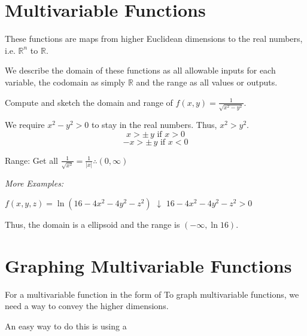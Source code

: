 \documentclass[../main.tex]{subfiles}
\begin{document}

\section{Multivariable Functions}

These functions are maps from higher Euclidean dimensions to the real numbers, i.e. \( \mathbb{R}^n \) to \( \mathbb{R} \).

We describe the domain of these functions as all allowable inputs for each variable, the codomain as simply \( \mathbb{R} \)
and the range as all values or outputs.

\begin{example}[]
    Compute and sketch the domain and range of \( f(x,y) = \frac{1}{\sqrt{x^2-y^2}} \).

    We require \( x^2-y^2 > 0 \) to stay in the real numbers. Thus, \( x^2 > y^2 \).
    \[ x > \pm \, y \text{ if } x > 0 \]
    \[ -x > \pm \, y \text{ if } x < 0 \]


    Range: Get all \( \frac{1}{\sqrt{x^2}} = \frac{1}{|x|} \therefore (0,\infty) \)
\end{example}

\textit{More Examples:}
\begin{center}
    \( f(x,y,z) = \ln(16-4x^2-4y^2-z^2) \)
    \( \downarrow \)
    \( 16-4x^2-4y^2-z^2 > 0 \)
\end{center} 
Thus, the domain is a ellipsoid and the range is \( (-\infty,\ln16) \).


\section{Graphing Multivariable Functions}

For a multivariable function in the form of 
To graph multivariable functions, we need a way to convey the higher dimensions.

An easy way to do this is using a 
\end{document}
